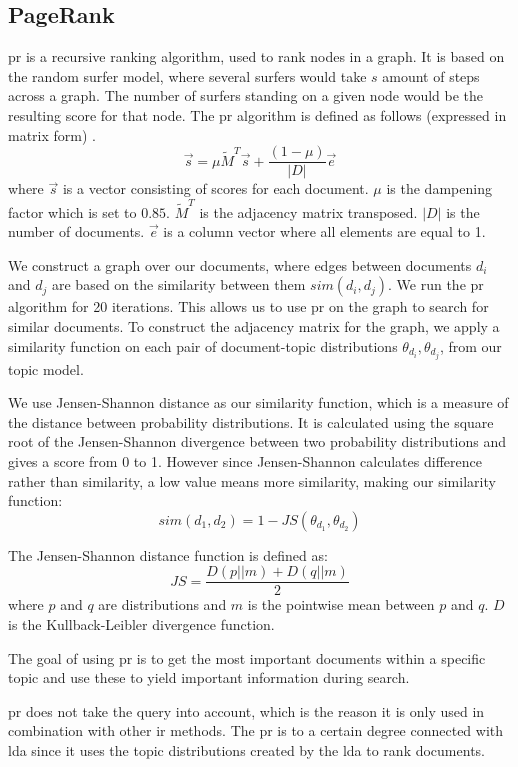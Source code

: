\subsection{PageRank}\label{sec:pagerank}
\gls{pr} is a recursive ranking algorithm, used to rank nodes in a graph.
It is based on the random surfer model, where several surfers would take $s$ amount of steps across a graph.
The number of surfers standing on a given node would be the resulting score for that node.
The \gls{pr} algorithm is defined as follows (expressed in matrix form) \cite{ClusterPageRank}.
$$ \overrightarrow{s} = \mu \widetilde{M}^T \overrightarrow{s} + \frac{(1-\mu)}{|D|} \overrightarrow{e} $$  
where $\overrightarrow{s}$ is a vector consisting of scores for each document. 
$\mu$ is the dampening factor which is set to $0.85$.
$\widetilde{M}^T$ is the adjacency matrix transposed.
$|D|$ is the number of documents.
$\overrightarrow{e}$ is a column vector where all elements are equal to 1.

We construct a graph over our documents, where edges between documents $d_i$ and $d_j$ are based on the similarity between them $sim(d_i, d_j)$.
We run the \gls{pr} algorithm for 20 iterations.
This allows us to use \gls{pr} on the graph to search for similar documents.
To construct the adjacency matrix for the graph, we apply a similarity function on each pair of document-topic distributions $\theta_{d_i}, \theta_{d_j}$, from our topic model.

We use Jensen-Shannon distance as our similarity function, which is a measure of the distance between probability distributions\cite{jensen-shannon2003}\cite{jensen-shannondis2003}.
It is calculated using the square root of the Jensen-Shannon divergence between two probability distributions and gives a score from 0 to 1.
However since Jensen-Shannon calculates difference rather than similarity, a low value means more similarity, making our similarity function:
$$sim(d_1, d_2) = 1 - JS(\theta_{d_1}, \theta_{d_2})$$

The Jensen-Shannon distance function is defined as:
$$ JS = \frac{D(p || m) + D(q || m)}{2}$$
where $p$ and $q$ are distributions and $m$ is the pointwise mean between $p$ and $q$. 
$D$ is the Kullback-Leibler divergence function.

The goal of using \gls{pr} is to get the most important documents within a specific topic and use these to yield important information during search.
  
\gls{pr} does not take the query into account, which is the reason it is only used in combination with other \gls{ir} methods. 
The \gls{pr} is to a certain degree connected with \gls{lda} since it uses the topic distributions created by the \gls{lda} to rank documents. 
